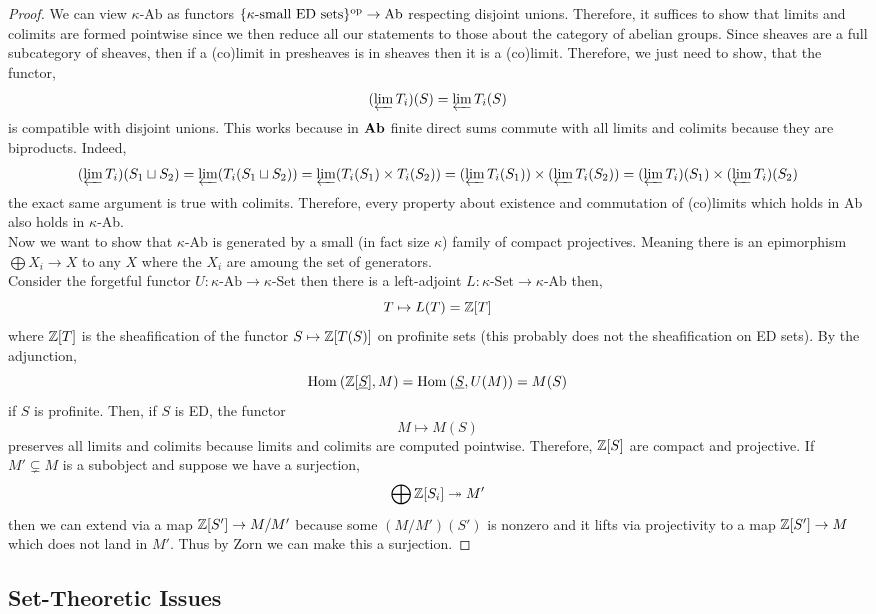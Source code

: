 \documentclass[12pt]{article}
\begin{document}
\begin{proof}
We can view $\kappa$-Ab as functors $\{ \kappa\text{-small ED sets} \}^{\mathrm{op}} \to \mathrm{Ab}$ respecting disjoint unions. Therefore, it suffices to show that limits and colimits are formed pointwise since we then reduce all our statements to those about the category of abelian groups. Since sheaves are a full subcategory of sheaves, then if a (co)limit in presheaves is in sheaves then it is a (co)limit. Therefore, we just need to show, that the functor,
\[ (\operatorname*{\varprojlim} T_i)(S) = \operatorname*{\varprojlim} T_i(S) \]
is compatible with disjoint unions. This works because in $\mathbf{Ab}$ finite direct sums commute with all limits and colimits because they are biproducts. Indeed,
\[ (\operatorname*{\varprojlim} T_i)(S_1 \sqcup S_2) = \operatorname*{\varprojlim} (T_i(S_1 \sqcup S_2)) = \operatorname*{\varprojlim} (T_i(S_1) \times T_i(S_2)) = (\operatorname*{\varprojlim} T_i(S_1)) \times (\operatorname*{\varprojlim} T_i(S_2)) = (\operatorname*{\varprojlim} T_i)(S_1) \times (\operatorname*{\varprojlim} T_i)(S_2) \]
the exact same argument is true with colimits. Therefore, every property about existence and commutation of (co)limits which holds in Ab also holds in $\kappa$-Ab.
\bigskip\\
Now we want to show that $\kappa$-Ab is generated by a small (in fact size $\kappa$) family of compact projectives. Meaning there is an epimorphism $\bigoplus X_i \to X$ to any $X$ where the $X_i$ are amoung the set of generators. 
\bigskip\\
Consider the forgetful functor $U : \kappa\text{-Ab} \to \kappa\text{-Set}$ then there is a left-adjoint $L : \kappa\text{-Set} \to \kappa\text{-Ab}$ then,
\[ T \mapsto L(T) = \mathbb{Z}[T] \]
where $\mathbb{Z}[T]$ is the sheafification of the functor $S \mapsto \mathbb{Z}[T(S)]$ on profinite sets (this probably does not the sheafification on ED sets). By the adjunction,
\[ \mathrm{Hom}_{} \left( \mathbb{Z}[\underline{S}], M \right) = \mathrm{Hom}_{} \left( \underline{S}, U(M) \right) = M(S) \]
if $S$ is profinite. Then, if $S$ is ED, the functor
\[ M \mapsto M(S) \]
preserves all limits and colimits because limits and colimits are computed pointwise. Therefore, $\mathbb{Z}[S]$ are compact and projective. If $M' \subsetneq M$ is a subobject and suppose we have a surjection,
\[ \bigoplus \mathbb{Z}[S_i] \twoheadrightarrow M' \]
then we can extend via a map $\mathbb{Z}[S'] \to M/M'$ because some $(M/M')(S')$ is nonzero and it lifts via projectivity to a map $\mathbb{Z}[S'] \to M$ which does not land in $M'$. Thus by Zorn we can make this a surjection.
\end{proof}

\subsection{Set-Theoretic Issues}
\end{document}
